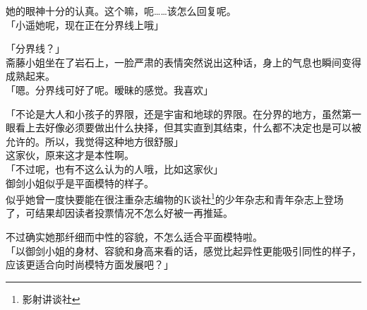 她的眼神十分的认真。这个嘛，呃……该怎么回复呢。\\

「小遥她呢，现在正在分界线上哦」

「分界线？」\\

斋藤小姐坐在了岩石上，一脸严肃的表情突然说出这种话，身上的气息也瞬间变得成熟起来。\\

「嗯。分界线可好了呢。暧昧的感觉。我喜欢」

「不论是大人和小孩子的界限，还是宇宙和地球的界限。在分界的地方，虽然第一眼看上去好像必须要做出什么抉择，但其实直到其结束，什么都不决定也是可以被允许的。所以，我觉得这种地方很舒服」\\

这家伙，原来这才是本性啊。\\

「不过呢，也有不这么认为的人哦，比如这家伙」\\

御剑小姐似乎是平面模特的样子。\\

似乎她曾一度快要能在很注重杂志编物的K谈社\footnote{影射讲谈社}的少年杂志和青年杂志上登场了，可结果却因读者投票情况不怎么好被一再推延。

不过确实她那纤细而中性的容貌，不怎么适合平面模特啦。\\

「以御剑小姐的身材、容貌和身高来看的话，感觉比起异性更能吸引同性的样子，应该更适合向时尚模特方面发展吧？」

